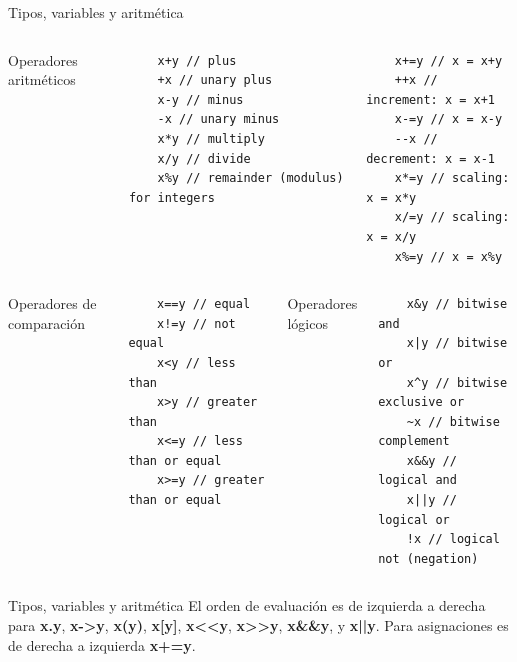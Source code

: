 \documentclass[11pt]{beamer}
\begin{document}
	
	\begin{frame}[fragile]{Tipos, variables y aritmética}
	\begin{columns}[t]
	Operadores aritméticos
	\begin{lstlisting}
	x+y // plus
	+x // unary plus
	x-y // minus
	-x // unary minus
	x*y // multiply
	x/y // divide
	x%y // remainder (modulus) for integers
	\end{lstlisting}	
	
	\begin{lstlisting}	
	x+=y // x = x+y
	++x // increment: x = x+1
	x-=y // x = x-y
	--x // decrement: x = x-1
	x*=y // scaling: x = x*y
	x/=y // scaling: x = x/y
	x%=y // x = x%y	
	\end{lstlisting}
	\end{columns}
	
	\begin{columns}[t]
	Operadores de comparación	
	\begin{lstlisting}	
	x==y // equal
	x!=y // not equal
	x<y // less than
	x>y // greater than
	x<=y // less than or equal
	x>=y // greater than or equal
	\end{lstlisting}	
	Operadores lógicos
	\begin{lstlisting}	
	x&y // bitwise and
	x|y // bitwise or
	x^y // bitwise exclusive or
	~x // bitwise complement
	x&&y // logical and
	x||y // logical or
	!x // logical not (negation)
	\end{lstlisting}

	\end{columns}

	\end{frame}

	\begin{frame}{Tipos, variables y aritmética}
	El orden de evaluación es de izquierda a derecha para \textbf{x.y}, \textbf{x->y}, \textbf{x(y)}, \textbf{x[y]}, \textbf{x<<y}, \textbf{x>>y}, \textbf{x\&\&y}, y \textbf{x||y}.
	\newline
	Para asignaciones es de derecha a izquierda \textbf{x+=y}.	
	\end{frame}
	
\end{document}
